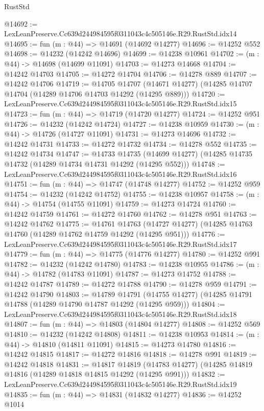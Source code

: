 \begin{lexlean}{RustStd}
\begin{coremodule}
@14692 := LexLeanPreserve.Cc639d244984595f0311043c4c505146e.R29.RustStd.idx14
@14695 := fun (m : @44) => @14691 (@14692 @14277)
@14696 := @14252 @552
@14698 := @14232 (@14242 @14696)
@14699 := @14238 @10961
@14702 := (m : @44) -> @14698 (@14699 @11091)
@14703 := @14273 @14668
@14704 := @14242 @14703
@14705 := @14272 @14704
@14706 := @14278 @889
@14707 := @14242 @14706
@14719 := @14705
    @14707
    (@14671 @14277)
    (@14285 @14707 @14704 (@14289 @14706 @14703 @14292 (@14295 @889)))
@14720 := LexLeanPreserve.Cc639d244984595f0311043c4c505146e.R29.RustStd.idx15
@14723 := fun (m : @44) => @14719 (@14720 @14277)
@14724 := @14252 @951
@14726 := @14232 (@14242 @14724)
@14727 := @14238 @10959
@14730 := (m : @44) -> @14726 (@14727 @11091)
@14731 := @14273 @14696
@14732 := @14242 @14731
@14733 := @14272 @14732
@14734 := @14278 @552
@14735 := @14242 @14734
@14747 := @14733
    @14735
    (@14699 @14277)
    (@14285 @14735 @14732 (@14289 @14734 @14731 @14292 (@14295 @552)))
@14748 := LexLeanPreserve.Cc639d244984595f0311043c4c505146e.R29.RustStd.idx16
@14751 := fun (m : @44) => @14747 (@14748 @14277)
@14752 := @14252 @959
@14754 := @14232 (@14242 @14752)
@14755 := @14238 @10957
@14758 := (m : @44) -> @14754 (@14755 @11091)
@14759 := @14273 @14724
@14760 := @14242 @14759
@14761 := @14272 @14760
@14762 := @14278 @951
@14763 := @14242 @14762
@14775 := @14761
    @14763
    (@14727 @14277)
    (@14285 @14763 @14760 (@14289 @14762 @14759 @14292 (@14295 @951)))
@14776 := LexLeanPreserve.Cc639d244984595f0311043c4c505146e.R29.RustStd.idx17
@14779 := fun (m : @44) => @14775 (@14776 @14277)
@14780 := @14252 @991
@14782 := @14232 (@14242 @14780)
@14783 := @14238 @10955
@14786 := (m : @44) -> @14782 (@14783 @11091)
@14787 := @14273 @14752
@14788 := @14242 @14787
@14789 := @14272 @14788
@14790 := @14278 @959
@14791 := @14242 @14790
@14803 := @14789
    @14791
    (@14755 @14277)
    (@14285 @14791 @14788 (@14289 @14790 @14787 @14292 (@14295 @959)))
@14804 := LexLeanPreserve.Cc639d244984595f0311043c4c505146e.R29.RustStd.idx18
@14807 := fun (m : @44) => @14803 (@14804 @14277)
@14808 := @14252 @569
@14810 := @14232 (@14242 @14808)
@14811 := @14238 @10953
@14814 := (m : @44) -> @14810 (@14811 @11091)
@14815 := @14273 @14780
@14816 := @14242 @14815
@14817 := @14272 @14816
@14818 := @14278 @991
@14819 := @14242 @14818
@14831 := @14817
    @14819
    (@14783 @14277)
    (@14285 @14819 @14816 (@14289 @14818 @14815 @14292 (@14295 @991)))
@14832 := LexLeanPreserve.Cc639d244984595f0311043c4c505146e.R29.RustStd.idx19
@14835 := fun (m : @44) => @14831 (@14832 @14277)
@14836 := @14252 @1014

\end{coremodule}
\end{lexlean}
